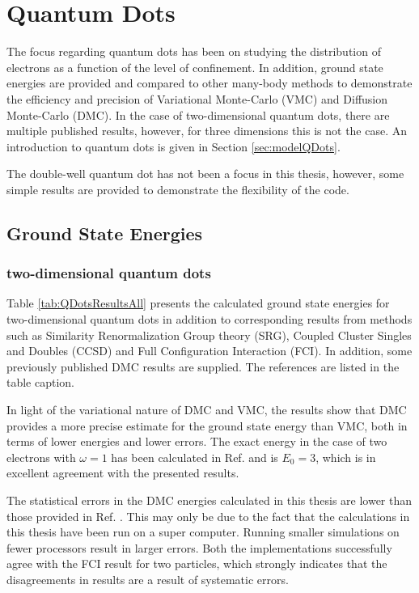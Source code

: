 \section{Quantum Dots}

The focus regarding quantum dots has been on studying the distribution of electrons as a function of the level of confinement. In addition, ground state energies are provided and compared to other many-body methods to demonstrate the efficiency and precision of Variational Monte-Carlo (VMC) and Diffusion Monte-Carlo (DMC). In the case of two-dimensional quantum dots, there are multiple published results, however, for three dimensions this is not the case. An introduction to quantum dots is given in Section \ref{sec:modelQDots}. 

The double-well quantum dot has not been a focus in this thesis, however, some simple results are provided to demonstrate the flexibility of the code.

\subsection{Ground State Energies}

\subsubsection{two-dimensional quantum dots}

Table \ref{tab:QDotsResultsAll} presents the calculated ground state energies for two-dimensional quantum dots in addition to corresponding results from methods such as Similarity Renormalization Group theory (SRG), Coupled Cluster Singles and Doubles (CCSD) and Full Configuration Interaction (FCI). In addition, some previously published DMC results are supplied. The references are listed in the table caption.

In light of the variational nature of DMC and VMC, the results show that DMC provides a more precise estimate for the ground state energy than VMC, both in terms of lower energies and lower errors. The exact energy in the case of two electrons with $\omega=1$ has been calculated in Ref. \cite{taut} and is $E_0 = 3$, which is in excellent agreement with the presented results.

The statistical errors in the DMC energies calculated in this thesis are lower than those provided in Ref. \cite{MagnusArticle}. This may only be due to the fact that the calculations in this thesis have been run on a super computer. Running smaller simulations on fewer processors result in larger errors. Both the implementations successfully agree with the FCI result for two particles, which strongly indicates that the disagreements in results are a result of systematic errors.    

